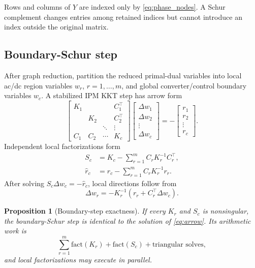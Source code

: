 \documentclass[journal,10pt]{IEEEtran}
\newtheorem{proposition}{Proposition}
\begin{document}
\begin{IEEEproof}
Rows and columns of $Y$ are indexed only by \eqref{eq:phase_nodes}.  A Schur
complement changes entries among retained indices but cannot introduce an index
outside the original matrix.
\end{IEEEproof}

\subsection{Boundary-Schur step}
After graph reduction, partition the reduced primal-dual variables into local
ac/dc region variables $w_r$, $r=1,\ldots,m$, and global converter/control
boundary variables $w_c$.  A stabilized IPM KKT step has arrow form
\begin{equation}
\begin{bmatrix}
K_1&&&C_1^\top\\
&K_2&&C_2^\top\\
&&\ddots&\vdots\\
C_1&C_2&\cdots&K_c
\end{bmatrix}
\begin{bmatrix}\Delta w_1\\\Delta w_2\\\vdots\\\Delta w_c\end{bmatrix}
=-
\begin{bmatrix}r_1\\r_2\\\vdots\\r_c\end{bmatrix}.
\label{eq:arrow}
\end{equation}
Independent local factorizations form
\begin{align}
 S_c&=K_c-\sum_{r=1}^{m}C_rK_r^{-1}C_r^\top,\label{eq:boundary_schur}\\
 \widehat r_c&=r_c-\sum_{r=1}^{m}C_rK_r^{-1}r_r.
\end{align}
After solving $S_c\Delta w_c=-\widehat r_c$, local directions follow from
\begin{equation}
 \Delta w_r=-K_r^{-1}(r_r+C_r^\top\Delta w_c).
\end{equation}

\begin{proposition}[Boundary-step exactness]\label{prop:boundary}
If every $K_r$ and $S_c$ is nonsingular, the boundary-Schur step is identical to
the solution of \eqref{eq:arrow}.  Its arithmetic work is
\begin{equation}
 \sum_{r=1}^{m}\mathrm{fact}(K_r)
 +\mathrm{fact}(S_c)+\text{triangular solves},       \label{eq:cost}
\end{equation}
and local factorizations may execute in parallel.
\end{proposition}
\end{document}
